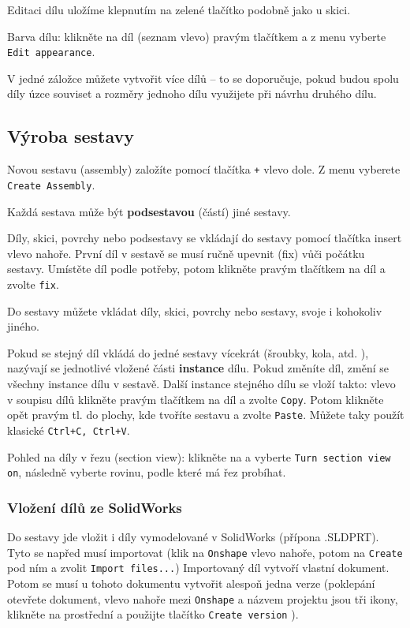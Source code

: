 Editaci dílu uložíme klepnutím na zelené tlačítko podobně jako u skici.

Barva dílu: klikněte na díl (seznam vlevo) pravým tlačítkem a  z menu vyberte {\tt Edit appearance}. 

V jedné záložce  můžete vytvořit více dílů -- to se doporučuje, pokud budou spolu díly úzce souviset a rozměry jednoho dílu využijete při návrhu druhého dílu. 



\subsection{Výroba sestavy} \label{sestava:vyroba} 

Novou sestavu (assembly) založíte pomocí tlačítka \texttt{+} vlevo dole. Z menu vyberete {\tt Create Assembly}.

Každá sestava může být \textbf{podsestavou} (částí) jiné sestavy. 

Díly, skici, povrchy nebo podsestavy se vkládají do sestavy pomocí tlačítka insert vlevo nahoře. 
První díl v sestavě se musí ručně upevnit (fix) vůči počátku sestavy. 
Umístěte díl podle potřeby, potom klikněte pravým tlačítkem na díl a zvolte {\tt fix}.

Do sestavy můžete vkládat díly, skici, povrchy nebo sestavy, svoje i kohokoliv jiného. 

Pokud se stejný díl vkládá do jedné sestavy vícekrát (šroubky, kola, atd. ), nazývají se jednotlivé vložené části \textbf{instance} dílu. 
Pokud změníte díl, změní se všechny instance dílu v sestavě.
Další instance stejného dílu se vloží takto: vlevo v soupisu dílů klikněte pravým tlačítkem na díl a zvolte {\tt Copy}. 
Potom klikněte opět pravým tl. do plochy, kde tvoříte sestavu a zvolte {\tt Paste}. Můžete taky použít klasické {\tt Ctrl+C, Ctrl+V}. 

Pohled na díly v řezu (section view): klikněte na  a vyberte {\tt Turn section view on}, následně vyberte rovinu, podle které má řez probíhat. 

\subsubsection{Vložení dílů ze SolidWorks}

Do sestavy jde vložit i díly vymodelované v SolidWorks (přípona .SLDPRT). 
Tyto se napřed musí importovat (klik na {\tt Onshape} vlevo nahoře, potom na {\tt Create } pod ním a zvolit {\tt Import files...}) 
Importovaný díl vytvoří vlastní dokument. Potom se musí u tohoto dokumentu vytvořit alespoň jedna verze (poklepání otevřete dokument, vlevo nahoře mezi {\tt Onshape} 
a názvem projektu jsou tři ikony, klikněte na prostřední a použijte tlačítko {\tt Create version} ). 

